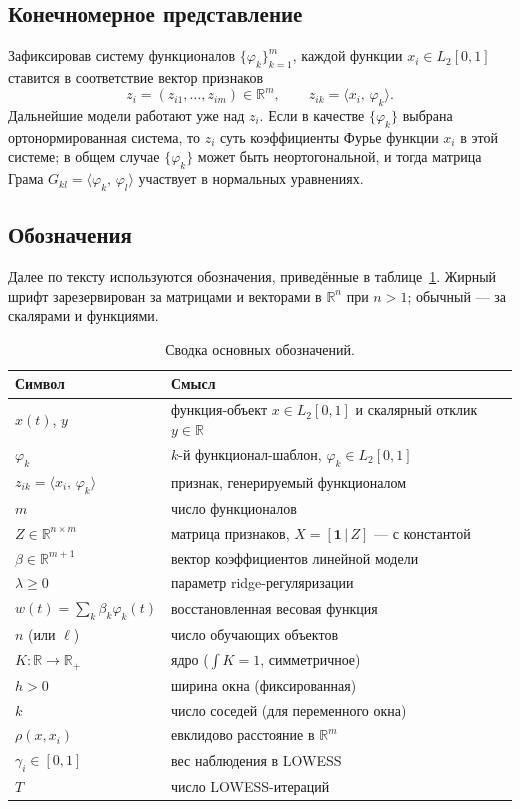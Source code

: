 \documentclass[12pt,a4paper]{article}
\theoremstyle{definition}
\theoremstyle{remark}
\newcommand{\R}{\mathbb{R}}
\newcommand{\Ltwo}{L_{2}[0,1]}
\newcommand{\inner}[2]{\langle #1,\,#2\rangle}
\begin{document}
\subsection{Конечномерное представление}

Зафиксировав систему функционалов $\{\varphi_{k}\}_{k=1}^{m}$, каждой функции
$x_{i}\in\Ltwo$ ставится в соответствие вектор признаков
\[
    z_{i}=(z_{i1},\dots,z_{im})\in\R^{m},\qquad
    z_{ik}=\inner{x_{i}}{\varphi_{k}}.
\]
Дальнейшие модели работают уже над $z_{i}$. Если в качестве
$\{\varphi_{k}\}$ выбрана ортонормированная система, то $z_{i}$ суть
коэффициенты Фурье функции $x_{i}$ в этой системе; в общем случае
$\{\varphi_{k}\}$ может быть неортогональной, и тогда матрица Грама
$G_{kl}=\inner{\varphi_{k}}{\varphi_{l}}$ участвует в нормальных уравнениях.

\subsection{Обозначения}
\label{sec:notation}

Далее по тексту используются обозначения, приведённые в
таблице~\ref{tab:notation}. Жирный шрифт зарезервирован за матрицами и
векторами в $\R^{n}$ при $n>1$; обычный --- за скалярами и функциями.

\begin{table}[H]
\centering
\small
\caption{Сводка основных обозначений.}
\label{tab:notation}
\begin{tabular}{ll}
\toprule
\textbf{Символ} & \textbf{Смысл} \\
\midrule
$x(t)$, $y$           & функция-объект $x\in\Ltwo$ и скалярный отклик $y\in\R$ \\
$\varphi_{k}$         & $k$-й функционал-шаблон, $\varphi_{k}\in\Ltwo$ \\
$z_{ik}=\inner{x_i}{\varphi_k}$
                      & признак, генерируемый функционалом \\
$m$                   & число функционалов \\
$Z\in\R^{n\times m}$  & матрица признаков, $X=[\mathbf{1}\,|\,Z]$ --- с константой \\
$\beta\in\R^{m+1}$    & вектор коэффициентов линейной модели \\
$\lambda\geq 0$       & параметр ridge-регуляризации \\
$w(t)=\sum_k\beta_k\varphi_k(t)$
                      & восстановленная весовая функция \\
$n$ (или $\ell$)      & число обучающих объектов \\
$K\colon\R\to\R_{+}$  & ядро ($\int K=1$, симметричное) \\
$h>0$                 & ширина окна (фиксированная) \\
$k$                   & число соседей (для переменного окна) \\
$\rho(x,x_i)$         & евклидово расстояние в $\R^{m}$ \\
$\gamma_{i}\in[0,1]$  & вес наблюдения в LOWESS \\
$T$                   & число LOWESS-итераций \\
\bottomrule
\end{tabular}
\end{table}
\end{document}
